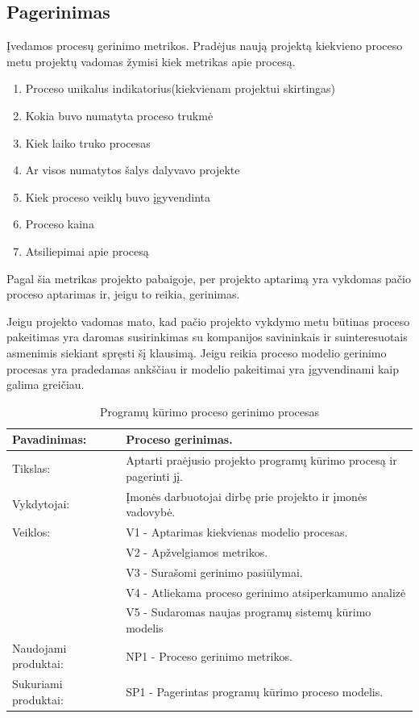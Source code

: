 \documentclass{VUMIFPSkursinis}
\begin{document}
			\subsection{Pagerinimas}
				Įvedamos procesų gerinimo metrikos.
				Pradėjus naują projektą kiekvieno proceso metu projektų vadomas žymisi kiek metrikas apie procesą.
					\begin{enumerate}
						\item{Proceso unikalus indikatorius(kiekvienam projektui skirtingas)}
						\item{Kokia buvo numatyta proceso trukmė}
						\item{Kiek laiko truko procesas}
						\item{Ar visos numatytos šalys dalyvavo projekte}
						\item{Kiek proceso veiklų buvo įgyvendinta}
						\item{Proceso kaina}
						\item{Atsiliepimai apie procesą}
					\end{enumerate}
				Pagal šia metrikas projekto pabaigoje, per projekto aptarimą yra vykdomas pačio proceso aptarimas ir, jeigu to reikia, gerinimas.

				Jeigu projekto vadomas mato, kad pačio projekto vykdymo metu būtinas proceso pakeitimas yra daromas susirinkimas su kompanijos savininkais ir suinteresuotais asmenimis siekiant spręsti šį klausimą. 
				Jeigu reikia proceso modelio gerinimo procesas yra pradedamas ankščiau ir modelio pakeitimai yra įgyvendinami kaip galima greičiau.
\pagebreak
	\begin{center}
		\begin{table}[ht]
			\caption{Programų kūrimo proceso gerinimo procesas}
			\begin{tabular}{ | l | l | }
				\hline
				Pavadinimas:		& Proceso gerinimas.						\\ \hline
				Tikslas:		& Aptarti praėjusio projekto programų kūrimo procesą ir pagerinti jį.			\\ \hline
				Vykdytojai:		& Įmonės darbuotojai dirbę prie projekto ir įmonės vadovybė.					\\ \hline
				Veiklos:		& V1 - Aptarimas kiekvienas modelio procesas. 				\\
							& V2 - Apžvelgiamos metrikos.	\\
							& V3 - Surašomi gerinimo pasiūlymai.				\\ 
							& V4 - Atliekama proceso gerinimo atsiperkamumo analizė \\ 
							& V5 - Sudaromas naujas programų sistemų kūrimo modelis \\ \hline
				Naudojami produktai:	& NP1 - Proceso gerinimo metrikos. 				\\ \hline
				Sukuriami produktai:	& SP1 - Pagerintas programų kūrimo proceso modelis.		\\ \hline
			\end{tabular}
		\end{table}
	\end{center}
\end{document}
